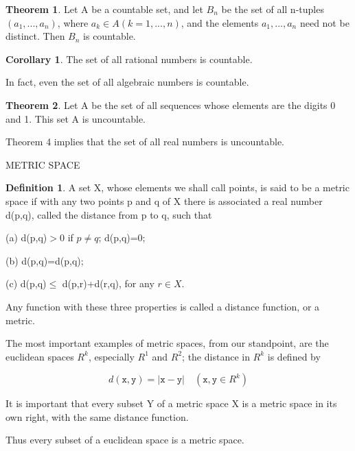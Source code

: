 \documentclass{article}
\theoremstyle{definition}
\newtheorem{defi}{Definition}
\newtheorem{theo}{Theorem}
\newtheorem{coro}{Corollary}
\theoremstyle{remark}
\begin{document}
	\begin{theo}
		Let A be a countable set, and let $B_n$ be the set of all n-tuples $(a_1,...,a_n)$, where $a_k\in A(k=1,...,n)$, and the elements $a_1,...,a_n$ need not be distinct. Then $B_n$ is countable.
	\end{theo}
	
	\begin{coro}
	The set of all rational numbers is countable.	
	\end{coro}
	
	In fact, even the set of all algebraic numbers is countable.
	
	\begin{theo}
		Let A be the set of all sequences whose elements are the digits 0 and 1. This set A is uncountable.
	\end{theo}

	Theorem 4 implies that the set of all real numbers is uncountable.
	
	\newpage
	
	METRIC SPACE
	
	\begin{defi}
		A set X, whose elements we shall call points, is said to be a metric space if with any two points p and q of X there is associated a real number d(p,q), called the distance from p to q, such that
		
		(a) d(p,q)$>$0 if $p\ne q$; d(p,q)=0;
		
		(b) d(p,q)=d(p,q);
		
		(c) d(p,q)$\le$ d(p,r)+d(r,q), for any $r\in X$.
		
		Any function with these three properties is called a distance function, or a metric.
	\end{defi}
	
	The most important examples of metric spaces, from our standpoint, are the euclidean spaces $R^k$, especially $R^1$ and $R^2$; the distance in $R^k$ is defined by
	
	\begin{equation}
		d(\mathtt{x},\mathtt{y})=|\mathtt{x}-\mathtt{y}|\quad (\mathtt{x},\mathtt{y}\in R^k)
	\end{equation}
	
	It is important that every subset Y of a metric space X is a metric space in its own right, with the same distance function.
	
	Thus every subset of a euclidean space is a metric space.
	
\end{document}

